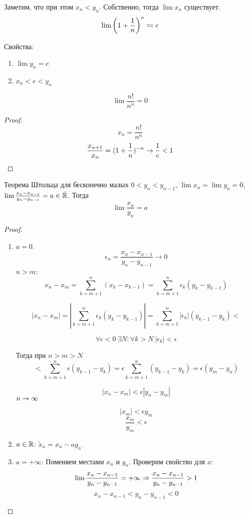 Заметим, что при этом $x_n < y_n$. Собственно, тогда $\lim x_n$ существует.
$$\lim \left(1+\frac1n\right)^n \leftrightharpoons e$$

Свойства:
\begin{enumerate}
\item $\lim y_n = e$
\item $x_n < e < y_n$
\end{enumerate}

\begin{conseq}
$$\lim \frac{n!}{n^n} = 0$$
\end{conseq}
\begin{proof}
$$x_n = \frac{n!}{n^n}$$
$$\frac{x_{n+1}}{x_n} = (1+\frac1n)^{-n} \rightarrow \frac1e < 1$$
\end{proof}

\begin{theorem}{Теорема Штольца для бесконечно малых}
$0<y_n<y_{n-1}$, $\lim x_n = \lim y_n = 0$, $\lim \frac{x_n-x_{n-1}}{y_n-y_{n-1}} = a \in \bar{\mathbb{R}}$.
Тогда 
$$\lim \frac{x_n}{y_n} = a$$
\end{theorem}
\begin{proof}
\begin{enumerate}
\item $a = 0$.
$$\epsilon_n = \frac{x_n - x_{n - 1}}{y_n - y_{n - 1}} \to 0$$
$n > m$:
$$x_n - x_m = \sum_{k = m + 1}^{n}(x_k - x_{k - 1}) = \sum_{k = m + 1}^{n}\epsilon_k(y_k - y_{k - 1})$$

$$|x_n - x_m| = \left|\sum_{k = m + 1}^{n}\epsilon_k(y_k - y_{k - 1})\right| = \sum_{k = m + 1}^{n} |\epsilon_k|(y_{k-1} - y_k) < $$

$$\forall \epsilon < 0\: \exists N\colon \forall k > N\: |\epsilon_k| < \epsilon$$

Тогда при $n > m > N$
$$< \sum^{n}_{k = m + 1}\epsilon(y_{k - 1} - y_k) = \epsilon\sum_{k = m + 1}^{n}(y_{k - 1} - y_k) = \epsilon(y_m - y_n)$$

$$|x_n - x_m| < \epsilon|y_n - y_m|$$
$n \rightarrow \infty$

$$|x_m| < \epsilon y_m$$
$$\frac{x_m}{y_m} < \epsilon$$

\item $a \in \mathbb{R}$: $\tilde x_n = x_n - a y_n$.
\item $a = +\infty$: Поменяем местами $x_n$ и $y_n$. Проверим свойство для $x$:
$$\lim \frac{x_n - x_{n-1}}{y_n - y_{n-1}} = +\infty \Rightarrow \frac{x_n - x_{n-1}}{y_n - y_{n-1}} > 1$$
$$x_n - x_{n-1} < y_n - y_{n-1} < 0$$
\end{enumerate}
\end{proof}

